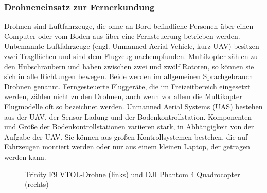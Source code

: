 \subsubsection{Drohneneinsatz zur Fernerkundung}

Drohnen sind Luftfahrzeuge, die ohne an Bord befindliche Personen über einen Computer oder vom Boden aus über eine Fernsteuerung betrieben werden. Unbemannte Luftfahrzeuge (engl. Unmanned Aerial Vehicle, kurz UAV) besitzen zwei Tragflächen und sind dem Flugzeug nachempfunden. Multikopter zählen zu den Hubschraubern und haben zwischen zwei und zwölf Rotoren, so können sie sich in alle Richtungen bewegen. Beide werden im allgemeinen Sprachgebrauch Drohnen genannt. Ferngesteuerte Fluggeräte, die im Freizeitbereich eingesetzt werden, zählen nicht zu den Drohnen, auch wenn vor allem die Multikopter Flugmodelle oft so bezeichnet werden. Unmanned Aerial Systems (UAS) bestehen aus der UAV, der Sensor-Ladung und der Bodenkontrollstation. Komponenten und Größe der Bodenkontrollstationen variieren stark, in Abhängigkeit von der Aufgabe der UAV. Sie können aus großen Kontrollsystemen bestehen, die auf Fahrzeugen montiert werden oder nur aus einem kleinen Laptop, der getragen werden kann. \citep[vgl.][]{Watts2012}
\begin{figure}[hbt]
\caption{Trinity F9 VTOL-Drohne (links) und DJI Phantom 4 Quadrocopter (rechts)}
  \label{fig:drohnen}
\end{figure}

